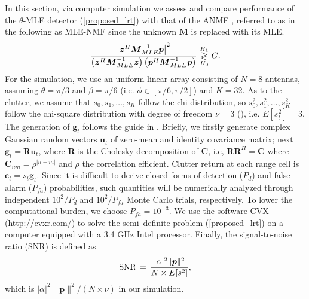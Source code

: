 In this section, via computer simulation we assess and compare performance
 of the $\theta$-MLE detector (\ref{proposed_lrt})
with that of the ANMF \cite{Conte95}, referred to as in the following as MLE-NMF since
the unknown $\boldsymbol{M}$ is replaced with its MLE.
\begin{equation}\label{anmf_recall}
\frac{\left |\boldsymbol{z}^H    \boldsymbol{M}_{MLE}^{-1}\boldsymbol{p} \right |^2}
     { \left (\boldsymbol{z}^H \boldsymbol{M}_{MLE}^{-1} \boldsymbol{z} \right )
   \left (\boldsymbol{p}^H \boldsymbol{M}_{MLE}^{-1} \boldsymbol{p} \right )}
   \thinspace\mathop{\gtrless}_{H_0}^{H_1}\thinspace G.
\end{equation}
For the simulation,
 we use an uniform linear array consisting of $N = 8$ antennas,
 assuming $\theta = \pi/3$ and $\beta = \pi/6$
 (i.e. $\phi \in [\pi/6, \pi/2]$) and $K = 32$.
 As to the clutter, we assume that $s_0,s_1,\ldots,s_K$
 follow the chi distribution, so $s_0^2,s_1^2,\ldots,s_K^2$ follow the chi-square distribution
 with degree of freedom $\nu = 3$ (\cite{Ward81}), i.e. $E[s_t^2] = 3$.
 The generation of $\boldsymbol{g}_t$
follows the guide in \cite{Rangaswamy95}. Briefly,
we firstly generate complex Gaussian random vectors $\boldsymbol{u}_t$
 of zero-mean and identity covariance matrix; next
 $\boldsymbol{g}_t = \boldsymbol{R} \boldsymbol{u}_t $,
where
 $\boldsymbol{R}$ is the Cholesky decomposition of $\boldsymbol{C}$, i.e,
 $\boldsymbol{R}\boldsymbol{R}^H = \boldsymbol{C}$
 where $\boldsymbol{C}_{nm} = \rho^{|n-m|}$
 and $\rho$ the correlation efficient.
 Clutter return at each range cell is $\boldsymbol{c}_t = s_t \boldsymbol{g}_t$.
 Since it is difficult to derive closed-forms of detection ($P_d$)
and false alarm ($P_{fa}$) probabilities, such quantities will be numerically analyzed
through independent $10^2 / P_{d}$ and $10^2 / P_{fa}$ Monte Carlo trials, respectively.
To lower the computational burden, we choose $P_{fa} = 10^{-3}$.
We use the software CVX (http://cvxr.com/) to solve the semi--deﬁnite problem
 (\ref{proposed_lrt}) on a computer equipped with a 3.4 GHz Intel processor.
Finally, the signal-to-noise ratio (SNR) is defined as
 \begin{equation}\label{SNR}
  \text{SNR} \thinspace = \thinspace
  \frac{| \alpha |^2 \| \boldsymbol{p} \|^2 }
        {N \times E[s^2]},
\end{equation}
which is $| \alpha |^2 \| \boldsymbol{p} \|^2 /(N \times \nu )$ in our simulation.
